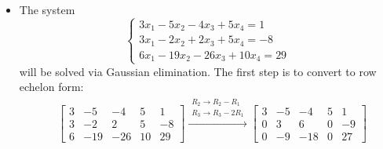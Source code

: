 \documentclass{article}
\begin{document}
\begin{itemize}
\[\begin{array}{c}
x_1 + 7x_3 = -19 \\
x_2 - 2x_3 = 5 \\
0 = 0
\end{array}\right.
\iff 
\left\{\begin{array}{c}
x_1 = -19 - 7x_3 \\
x_2 = 5 + 2x_3 
\end{array}\right.\]
\(x_3\) is a free variable and can be set to an arbitrary value \(t\). Therefore:
\[\begin{bmatrix} x_1 \\ x_2 \\ x_3 \end{bmatrix} 
= \begin{bmatrix} -19 - 7t \\ 5 + 2t \\ t \end{bmatrix}
= \begin{bmatrix} -19 \\ 5 \\ 0 \end{bmatrix} + t\begin{bmatrix} -7 \\ 2 \\ 1 \end{bmatrix}\]
\item 
The system
\[\left\{\begin{array}{c}
3x_1 - 5x_2 - 4x_3 + 5x_4 = 1 \\
3x_1 - 2x_2 + 2x_3 + 5x_4 = -8 \\
6x_1 - 19x_2 - 26x_3 + 10x_4 = 29
\end{array}\right.\]
will be solved via Gaussian elimination. The first step is to convert to row echelon form:  
\begin{align*}
& \left[\begin{array}{cccc|c}
3 & -5 & -4 & 5 & 1 \\
3 & -2 & 2 & 5 & -8 \\
6 & -19 & -26 & 10 & 29
\end{array}\right]
\xrightarrow{\begin{array}{c} R_2 \rightarrow R_2 - R_1 \\ R_3 \rightarrow R_3 - 2R_1 \end{array}} 
\left[\begin{array}{cccc|c}
3 & -5 & -4 & 5 & 1 \\
0 & 3 & 6 & 0 & -9 \\
0 & -9 & -18 & 0 & 27
\end{array}\right] \\

\end{align*}
\end{itemize}
\end{document}
